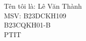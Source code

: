 \documentclass[preview]{standalone}
\begin{document}
Tên tôi là: Lê Văn Thành\\MSV: B23DCKH109\\B23CQKH01-B\\PTIT\\
\end{document}
